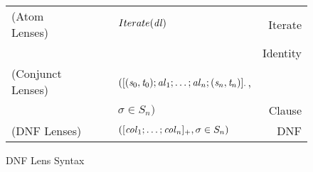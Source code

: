 \begin{figure}
\centering
\begin{tabular}{l@{\ }l@{\ }c@{\ }l@{\ }r}
(Atom Lenses) &\AtomLens{} & \GEq{} & $Iterate(\mathit{dl})$ & Iterate\\
& & & \GBar{} \IdentityLens{} & Identity\\
(Conjunct Lenses) &\ConjunctLens{} & \GEq{} &
$([(\mathit{s}_0,\mathit{t}_0);\mathit{al}_1;\ldots;\mathit{al}_n;(\mathit{s}_n,\mathit{t}_n)]_{\cdot}$, &\\
& & & $\sigma \in S_n)$ & Clause\SubN{}\\
(DNF Lenses)& \DNFLens{} & \GEq{} & $([\mathit{col}_1;\ldots;\mathit{col}_n]_{+}, \sigma \in S_n)$ & DNF\SubN{}\\
\end{tabular}
\caption{DNF Lens Syntax }
\label{fig:dnf-lens-syntax}
\end{figure}
